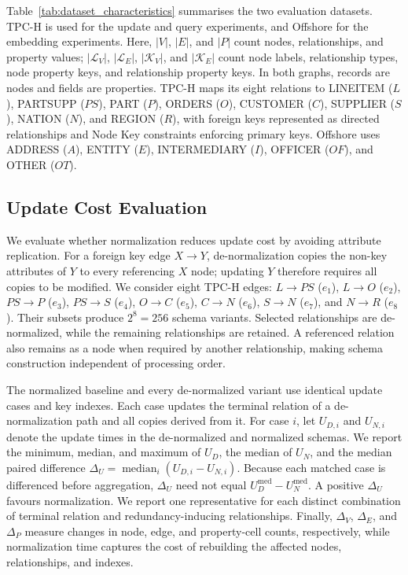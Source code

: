 \documentclass[sigconf]{acmart}
\begin{document}
Table~\ref{tab:dataset_characteristics} summarises the two evaluation datasets.
TPC-H is used for the update and query experiments, and Offshore for the
embedding experiments.
Here, $|V|$, $|E|$, and $|P|$ count nodes, relationships, and property values;
$|\mathcal{L}_V|$, $|\mathcal{L}_E|$, $|\mathcal{K}_V|$, and
$|\mathcal{K}_E|$ count node labels, relationship types, node property keys,
and relationship property keys.
In both graphs, records are nodes and fields are properties. TPC-H maps its
eight relations to \textsf{LINEITEM} ($L$), \textsf{PARTSUPP} ($PS$),
\textsf{PART} ($P$), \textsf{ORDERS} ($O$), \textsf{CUSTOMER} ($C$),
\textsf{SUPPLIER} ($S$), \textsf{NATION} ($N$), and \textsf{REGION} ($R$),
with foreign keys represented as directed relationships and Node Key
constraints enforcing primary keys. Offshore uses \textsf{ADDRESS} ($A$),
\textsf{ENTITY} ($E$), \textsf{INTERMEDIARY} ($I$), \textsf{OFFICER} ($OF$),
and \textsf{OTHER} ($OT$).


\subsection{Update Cost Evaluation}
We evaluate whether normalization reduces update cost by avoiding attribute
replication. For a foreign key edge $X\rightarrow Y$, de-normalization copies
the non-key attributes of $Y$ to every referencing $X$ node; updating $Y$
therefore requires all copies to be modified. We consider eight TPC-H edges:
$L\rightarrow PS$ ($e_1$), $L\rightarrow O$ ($e_2$),
$PS\rightarrow P$ ($e_3$), $PS\rightarrow S$ ($e_4$),
$O\rightarrow C$ ($e_5$), $C\rightarrow N$ ($e_6$),
$S\rightarrow N$ ($e_7$), and $N\rightarrow R$ ($e_8$).
Their subsets produce $2^8=256$ schema variants. Selected relationships are
de-normalized, while the remaining relationships are retained. A referenced
relation also remains as a node when required by another relationship, making
schema construction independent of processing order.

The normalized baseline and every de-normalized variant use identical update
cases and key indexes. Each case updates the terminal relation of a
de-normalization path and all copies derived from it. For case $i$, let
$U_{D,i}$ and $U_{N,i}$ denote the update times in the de-normalized and
normalized schemas. We report the minimum, median, and maximum of $U_D$, the
median of $U_N$, and the median paired difference
$\Delta_U=\operatorname{median}_i(U_{D,i}-U_{N,i})$. Because each matched case
is differenced before aggregation, $\Delta_U$ need not equal
$U_D^{\mathrm{med}}-U_N^{\mathrm{med}}$. A positive $\Delta_U$ favours
normalization. We report one representative for each distinct combination of
terminal relation and redundancy-inducing relationships. Finally,
$\Delta_V$, $\Delta_E$, and $\Delta_P$ measure changes in node, edge, and
property-cell counts, respectively, while normalization time captures the cost
of rebuilding the affected nodes, relationships, and indexes.
\end{document}
